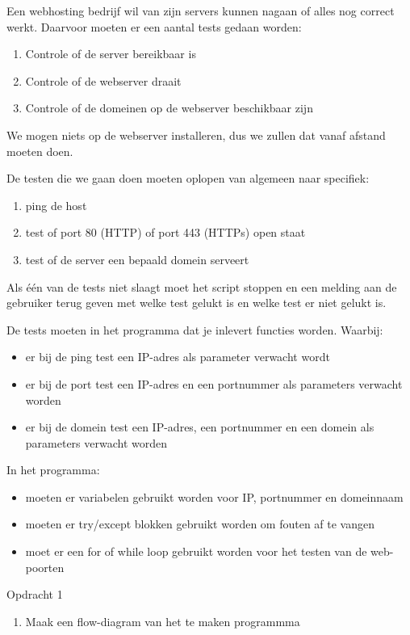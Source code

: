 Een webhosting bedrijf wil van zijn servers kunnen nagaan of alles nog correct werkt. Daarvoor moeten er een aantal tests gedaan worden:
\begin{enumerate}
	\item Controle of de server bereikbaar is
	\item Controle of de webserver draait
	\item Controle of de domeinen op de webserver beschikbaar zijn
\end{enumerate}
We mogen niets op de webserver installeren, dus we zullen dat vanaf afstand moeten doen.

De testen die we gaan doen moeten oplopen van algemeen naar specifiek:
\begin{enumerate}
\item ping de host
\item test of port 80 (HTTP) of port 443 (HTTPs) open staat
\item test of de server een bepaald domein serveert
\end{enumerate}
Als \'e\'en van de tests niet slaagt moet het script stoppen en een melding aan de gebruiker terug geven met welke test gelukt is en welke test er niet gelukt is.

De tests moeten in het programma dat je inlevert functies worden. Waarbij:
\begin{itemize}
	\item er bij de ping test een IP-adres als parameter verwacht wordt
	\item er bij de port test een IP-adres en een portnummer als parameters verwacht worden
	\item er bij de domein test een IP-adres, een portnummer en een domein als parameters verwacht worden
\end{itemize}

In het programma:
\begin{itemize}
	\item moeten er variabelen gebruikt worden voor IP, portnummer en domeinnaam
	\item moeten er try/except blokken gebruikt worden om fouten af te vangen
	\item moet er een for of while loop gebruikt worden voor het testen van de web-poorten
\end{itemize}

Opdracht 1
\begin{enumerate}
	\item Maak een flow-diagram van het te maken programmma
\end{enumerate}

